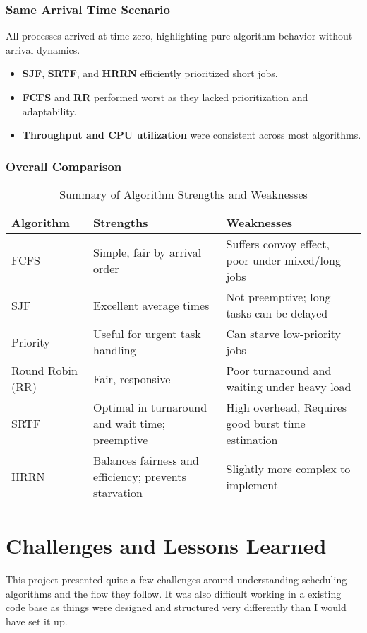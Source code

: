 \documentclass[conference]{report}
\begin{document}
\subsection*{Same Arrival Time Scenario}
All processes arrived at time zero, highlighting pure algorithm behavior without arrival dynamics.

\begin{itemize}
    \item \textbf{SJF}, \textbf{SRTF}, and \textbf{HRRN} efficiently prioritized short jobs.
    \item \textbf{FCFS} and \textbf{RR} performed worst as they lacked prioritization and adaptability.
    \item \textbf{Throughput and CPU utilization} were consistent across most algorithms.
\end{itemize}

\subsection*{Overall Comparison}
\begin{table}[h!]
    \centering
    \begin{tabular}{|l|p{4.5cm}|p{4.5cm}|}
        \hline
            \textbf{Algorithm} & \textbf{Strengths} & \textbf{Weaknesses} \\
        \hline
            FCFS & Simple, fair by arrival order & Suffers convoy effect, poor under mixed/long jobs \\
        \hline
            SJF & Excellent average times & Not preemptive; long tasks can be delayed \\
        \hline
            Priority & Useful for urgent task handling & Can starve low-priority jobs \\
        \hline
            Round Robin (RR) & Fair, responsive & Poor turnaround and waiting under heavy load \\
        \hline
            SRTF & Optimal in turnaround and wait time; preemptive & High overhead, Requires good burst time estimation \\
        \hline
            HRRN & Balances fairness and efficiency; prevents starvation & Slightly more complex to implement \\
        \hline
        \end{tabular}
    \caption{Summary of Algorithm Strengths and Weaknesses}
    \label{tab:algorithm-summary}
\end{table}

\chapter{Challenges and Lessons Learned}
This project presented quite a few challenges around understanding scheduling algorithms and the flow they follow. It was also difficult working in a existing code base as things were designed and structured very differently than I would have set it up.
\end{document}

